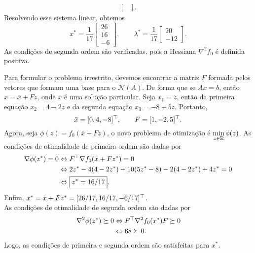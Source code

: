\begin{questions}
\begin{solution}
\begin{parts}
\begin{align*}
\begin{bmatrix}
        \end{bmatrix}.
    \end{align*}
    Resolvendo esse sistema linear, obtemos
    \[
        x^* = \frac{1}{17}
        \begin{bmatrix}
            26\\ 16\\ -6
        \end{bmatrix}, \qquad
        \lambda^* = \frac{1}{17}
        \begin{bmatrix}
            20\\ -12
        \end{bmatrix}.
    \]
    As condições de segunda ordem são verificadas, pois a Hessiana $\nabla^2 f_0$ é definida positiva.
    
    Para formular o problema irrestrito, devemos encontrar a matriz $F$ formada pelos vetores que formam uma base para o $\mathscr{N}(A)$. De forma que se $Ax=b$, então $x=\bar x + Fz$, onde $\bar x$ é uma solução particular. Seja $x_1 = z$, então da primeira equação $x_2 = 4-2z$ e da segunda equação $x_3 = -8 + 5z$. Portanto,
    \[\bar x = [0, 4, -8]^\top, \qquad F = [1, -2, 5]^\top.\]
    Agora, seja $\phi(z) = f_0(\bar x + Fz)$, o novo problema de otimização é $\displaystyle\min_{z\in{\mathbb R}} \phi(z)$.
    As condições de otimalidade de primeira ordem são dadas por
    \begin{align*}
        \nabla \phi(z^*) = 0 &\Leftrightarrow F^\top \nabla f_0(\bar x + Fz^*) = 0\\
            &\Leftrightarrow 2z^* - 4(4-2z^*) + 10(5z^*-8) -2(4-2z^*) + 4z^* = 0\\
            &\Leftrightarrow \boxed{z^* = 16/17}.
    \end{align*}
    Enfim, $x^* = \bar x + Fz^* = [26/17,16/17,-6/17]^\top$.\\
    As condições de otimalidade de segunda ordem são dadas por
    \begin{align*}
        \nabla^2 \phi(z^*) \succeq 0 &\Leftrightarrow F^\top \nabla^2 f_0(x^*) F \succeq 0\\
            &\Leftrightarrow 68 \succeq 0.
    \end{align*}
    Logo, as condições de primeira e segunda ordem são satisfeitas para $x^*$.
    

\end{parts}
\end{solution}
\end{questions}
